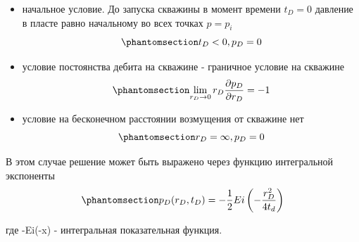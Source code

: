 \documentclass[
  russian,
  letterpaper,
  DIV=11,
  numbers=noendperiod,
  oneside]{scrartcl}
\begin{document}
\begin{itemize}
\item
  начальное условие. До запуска скважины в момент времени \(t_D = 0\)
  давление в пласте равно начальному во всех точках \(p=p_i\)
  \begin{equation}\phantomsection\label{eq-initial_condition}{ 
  t_D < 0, p_D = 0 
  }\end{equation}
\item
  условие постоянства дебита на скважине - граничное условие на скважине
  \begin{equation}\phantomsection\label{eq-bound_condition_well}{ 
  \lim_{r_D \to 0} {r_D \frac{\partial p_D}{\partial r_D}} = -1  
  }\end{equation}
\item
  условие на бесконечном расстоянии возмущения от скважине нет
  \begin{equation}\phantomsection\label{eq-bound_condition_inf}{ 
  r_D = \infty, p_D = 0 
  }\end{equation}
\end{itemize}

В этом случае решение может быть выражено через функцию интегральной
экспоненты \begin{equation}\phantomsection\label{eq-eq_solution_d}{ 
p_D(r_D,t_D) = - \frac{1}{2} Ei \left(- \dfrac{ r_D^2}{4t_d} \right)
}\end{equation}

где -Ei(-x) - интегральная показательная функция.
\end{document}
